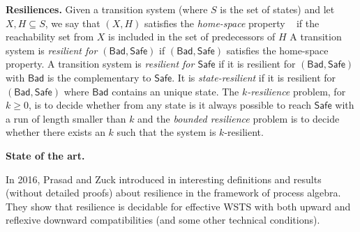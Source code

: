 \documentclass[runningheads]{llncs}
\newcommand{\pred}{\textsf{pred}}
\newcommand{\post}{\textsf{post}}
\newcommand{\Bad}{\textsf{Bad}}
\newcommand{\Safe}{\textsf{Safe}}
\begin{document}
\noindent
{\bf Resiliences.}  
%
Given a transition system (where $S$ is the set of states) and let $X,H \subseteq S$, we say that $(X,H)$ satisfies the \emph{home-space} property ~\cite{DBLP:conf/ac/MemmiV86} if the reachability set from $X$ is included in the set of predecessors of $H$ 
%
A transition system is {\em resilient for $(\Bad,\Safe)$} if $(\Bad,\Safe)$ satisfies the home-space property. A transition system is {\em resilient for $\Safe$} if it is resilient for $(\Bad,\Safe)$ with $\Bad$ is the complementary to $ \Safe$. It is {\em state-resilient} if it is resilient for $(\Bad,\Safe)$ where $\Bad$ contains an unique state.
%
%
%
The {\em $k$-resilience} problem, for $k\geq0$, is to decide whether from any state is it always possible to reach $\Safe$ with a run of length smaller than $k$ 
%
%
 and 
the {\em bounded resilience} problem is to decide whether there exists an $k$ such that the system is $k$-resilient.

\noindent
{\bf State of the art.}
%

In 2016, Prasad and Zuck introduced in \cite{DBLP:journals/corr/PrasadZ16} interesting definitions and results (without detailed proofs) about resilience in the framework of process algebra. They show that resilience is decidable for effective WSTS with both upward and reflexive downward compatibilities (and some other technical conditions).
\end{document}
